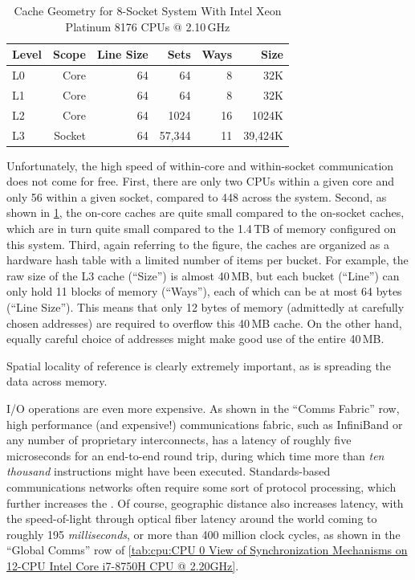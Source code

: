 \begin{table}
\renewcommand*{\arraystretch}{1.1}
\centering\small
\begin{tabular}{lrrrrr}
	\toprule
	Level &  Scope & Line Size &   Sets & Ways &    Size \\
	\midrule
	L0    &   Core &        64 &     64 &    8 &     32K \\
	L1    &   Core &        64 &     64 &    8 &     32K \\
	L2    &   Core &        64 &   1024 &   16 &   1024K \\
	L3    & Socket &        64 & 57,344 &   11 & 39,424K \\
	\bottomrule
\end{tabular}
\caption{Cache Geometry for 8-Socket System With Intel Xeon Platinum 8176 CPUs @ 2.10\,GHz}
\label{tab:cpu:Cache Geometry for 8-Socket System With Intel Xeon Platinum 8176 CPUs @ 2.10GHz}
\end{table}

Unfortunately, the high speed of within-core and within-socket communication
does not come for free.
First, there are only two CPUs within a given core and only 56 within
a given socket, compared to 448 across the system.
Second, as shown in
\cref{tab:cpu:Cache Geometry for 8-Socket System With Intel Xeon Platinum 8176 CPUs @ 2.10GHz},
the on-core caches are quite small compared to the on-socket caches, which
are in turn quite small compared to the 1.4\,TB of memory configured on
this system.
Third, again referring to the figure, the caches are organized as
a hardware hash table with a limited number of items per bucket.
For example, the raw size of the L3 cache (``Size'') is almost 40\,MB, but each
bucket (``Line'') can only hold 11 blocks of memory (``Ways''), each
of which can be at most 64 bytes (``Line Size'').
This means that only 12 bytes of memory (admittedly at carefully chosen
addresses) are required to overflow this 40\,MB cache.
On the other hand, equally careful choice of addresses might make good
use of the entire 40\,MB.

Spatial locality of reference is clearly extremely important, as is
spreading the data across memory.

I/O operations are even more expensive.
As shown in the ``Comms Fabric'' row,
high performance (and expensive!\@) communications fabric, such as
InfiniBand or any number of proprietary interconnects, has a latency
of roughly five microseconds for an end-to-end round trip, during which
time more than \emph{ten thousand} instructions might have been executed.
Standards-based communications networks often require some sort of
protocol processing, which further increases the .
Of course, geographic distance also increases latency, with the
speed-of-light through optical fiber latency around the world coming to
roughly 195 \emph{milliseconds}, or more than 400 million clock
cycles, as shown in the ``Global Comms'' row of
\cref{tab:cpu:CPU 0 View of Synchronization Mechanisms on 12-CPU Intel Core i7-8750H CPU @ 2.20GHz}.

